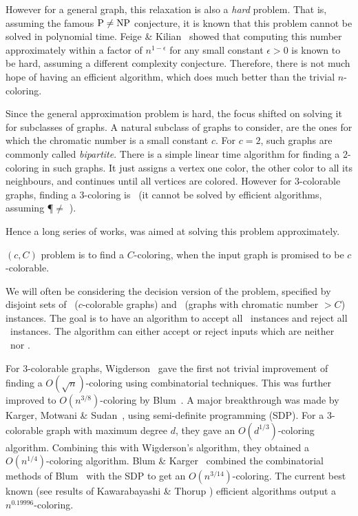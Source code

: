 However for a general graph, this relaxation is also a \emph{hard} problem. That
is, assuming the famous $\textsf{\textnormal{P}}\neq \textsf{\textnormal{NP}}$ conjecture, it is known that this problem
cannot be solved in polynomial time. Feige \& Kilian~\cite{FeigeK00} showed that
computing this number approximately within a factor of $n^{1-\epsilon}$ for any
small constant $\epsilon >0$ is known to be  hard, assuming a different complexity
conjecture. Therefore, there is not much hope of having an efficient algorithm,
which does much better than the trivial $n$-coloring.

Since the general approximation problem is hard, the focus shifted on solving it
for subclasses of graphs. A natural subclass of graphs to consider, are the ones
for which the chromatic number is a small constant $c$. For $c=2$, such graphs
are commonly called \emph{bipartite}. There is a simple linear time algorithm
for finding a $2$-coloring in such graphs. It just assigns a vertex one color,
the other color to all its neighbours, and continues until all vertices are
colored. However for $3$-colorable graphs, finding a $3$-coloring is \NPHard\
(it cannot be solved by efficient algorithms, assuming \P$\neq$ \NP).

Hence a long series of works, was aimed at solving this problem approximately.
\begin{definition} 
\ApproximateGraphColoring$(c,C)$ problem is to find a
$C$-coloring, when the input graph is promised to be $c$-colorable.
\end{definition} 

\begin{remark}
We will often be considering the decision version of the problem, specified by
disjoint sets of \YES\ ($c$-colorable graphs) and \NO\ (graphs with chromatic
number $> C$) instances. The goal is to have an algorithm to accept all \YES\
instances and reject all \NO\ instances. The algorithm can either accept 
or reject inputs which are neither \YES\ nor \NO. 
\end{remark}

For $3$-colorable
graphs, Wigderson~\cite{Wigderson83} gave the first not trivial improvement of
finding a $O(\sqrt n)$-coloring using combinatorial techniques. This was further
improved to $O(n^{3/8})$-coloring by Blum~\cite{Blum94}. A major breakthrough
 was made by Karger, Motwani \&
Sudan~\cite{KargerMS1998}, using semi-definite programming (SDP). For a
$3$-colorable graph with maximum degree $d$, they gave an $O(d^{1/3})$-coloring
algorithm. Combining this with Wigderson's algorithm, they obtained a
$O(n^{1/4})$-coloring algorithm. Blum \& Karger~\cite{BlumK1997} combined the
combinatorial methods of Blum~\cite{Blum94} with the SDP to get an
$O(n^{3/14})$-coloring. The current best known (see results of Kawarabayashi \& Thorup
\cite{KawarabayashiT2014}) efficient algorithms output a $n^{0.19996}$-coloring.


